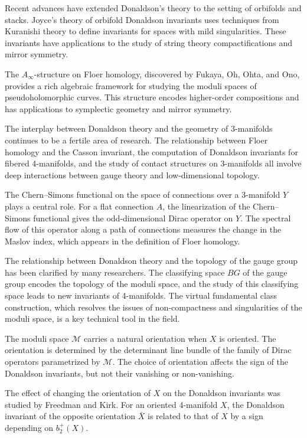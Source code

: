 Recent advances have extended Donaldson's theory to the setting of orbifolds and stacks. Joyce's theory of orbifold Donaldson invariants uses techniques from Kuranishi theory to define invariants for spaces with mild singularities. These invariants have applications to the study of string theory compactifications and mirror symmetry.

The $A_\infty$-structure on Floer homology, discovered by Fukaya, Oh, Ohta, and Ono, provides a rich algebraic framework for studying the moduli spaces of pseudoholomorphic curves. This structure encodes higher-order compositions and has applications to symplectic geometry and mirror symmetry.

The interplay between Donaldson theory and the geometry of 3-manifolds continues to be a fertile area of research. The relationship between Floer homology and the Casson invariant, the computation of Donaldson invariants for fibered 4-manifolds, and the study of contact structures on 3-manifolds all involve deep interactions between gauge theory and low-dimensional topology.

The Chern--Simons functional on the space of connections over a 3-manifold $Y$ plays a central role. For a flat connection $A$, the linearization of the Chern--Simons functional gives the odd-dimensional Dirac operator on $Y$. The spectral flow of this operator along a path of connections measures the change in the Maslov index, which appears in the definition of Floer homology.

The relationship between Donaldson theory and the topology of the gauge group has been clarified by many researchers. The classifying space $BG$ of the gauge group encodes the topology of the moduli space, and the study of this classifying space leads to new invariants of 4-manifolds. The virtual fundamental class construction, which resolves the issues of non-compactness and singularities of the moduli space, is a key technical tool in the field.

The moduli space $\mathcal{M}$ carries a natural orientation when $X$ is oriented. The orientation is determined by the determinant line bundle of the family of Dirac operators parametrized by $\mathcal{M}$. The choice of orientation affects the sign of the Donaldson invariants, but not their vanishing or non-vanishing.

The effect of changing the orientation of $X$ on the Donaldson invariants was studied by Freedman and Kirk. For an oriented 4-manifold $X$, the Donaldson invariant of the opposite orientation $\bar{X}$ is related to that of $X$ by a sign depending on $b_2^+(X)$.

